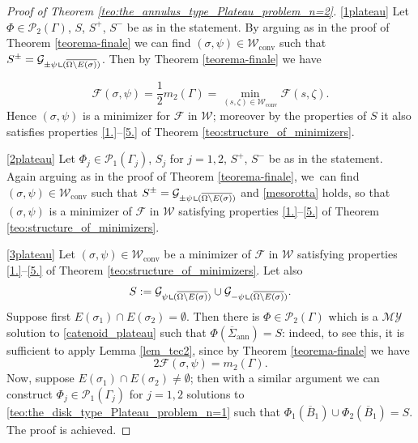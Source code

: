 \documentclass[JEP,XML,SOM,Unicode, NoFloatCountersInSection,published]{cedram}
\let\Om\Omega
\newcommand\admclassconv{{\mathcal W_\mathrm{conv}}}
\newcommand{\immclosedann}{\Phi({\overline\Sigma}_\mathrm{ann})}
\newcommand{\resa}{\mathop{\hbox{\vrule height 7pt width 0.5pt depth 0pt
\vrule height 0.5pt width 6pt depth 0pt}}\nolimits}
\newcommand{\resb}{\mathop{\hbox{\vrule height 4pt width 0.5pt depth 0pt
\vrule height 0.5pt width 3pt depth 0pt}}\nolimits}
\newcommand{\res}{\mathchoice{\resa}{\resa}{\resb}{\resb}}
\theoremstyle{definition}
\begin{document}
\skpt
\begin{proof}[Proof of Theorem \ref{teo:the_annulus_type_Plateau_problem_n=2}]

\ref{1plateau} Let $\Phi\in\mathcal{P}_2(\Gamma)$, $S$, $S^+$, $S^-$ be as in the statement.
By arguing as in the proof of Theorem \ref{teorema-finale} we can find $(\sigma,\psi)\in\admclassconv$ such that $S^\pm=\mathcal{G}_{\pm\psi\res (\overline{\Om\setminus E(\sigma)})}$.
Then by Theorem \ref{teorema-finale} we have

\begin{equation}\label{mesorotta}
\mathcal{F}(\sigma,\psi)=\frac12 m_2(\Gamma)= \min_{(s,\zeta)\in\admclassconv}\mathcal{F}(s,\zeta).
\end{equation}
Hence $(\sigma,\psi)$ is a minimizer for $\mathcal F$ in $\mathcal W$; moreover by the properties of $S$ it also satisfies properties \ref{1.}--\ref{5.} of Theorem \ref{teo:structure_of_minimizers}.

\ref{2plateau}
Let $\Phi_j\in \mathcal{P}_1(\Gamma_j)$, $S_j$ for $j=1,2$, $S^+$, $S^-$ be as in the statement.
Again arguing as in the proof of Theorem \ref{teorema-finale}, we~can find $(\sigma,\psi)\in\admclassconv$ such that $S^\pm=\mathcal{G}_{\pm\psi\res(\overline{\Om\setminus E(\sigma)})}$ and \eqref{mesorotta} holds, so that $(\sigma,\psi)$ is a minimizer of $\mathcal F$ in $\mathcal W$ satisfying properties \ref{1.}--\ref{5.} of Theorem \ref{teo:structure_of_minimizers}.

\ref{3plateau} Let $(\sigma,\psi)\in\admclassconv$ be a minimizer of $\mathcal F$ in $\mathcal W$ satisfying properties \ref{1.}--\ref{5.} of Theorem \ref{teo:structure_of_minimizers}. Let also
\[
S:=\mathcal G_{\psi\res (\overline{\Om\setminus E(\sigma)})}\cup\mathcal G_{-\psi\res (\overline{\Om\setminus E(\sigma)})}.
\]
Suppose first $E(\sigma_1)\cap E(\sigma_2)=\emptyset$. Then
there is $\Phi\in \mathcal{P}_2(\Gamma)$ which is a $\mathcal{MY}$ solution to \eqref{catenoid_plateau} such that $\immclosedann=S$:
indeed, to see this, it is sufficient to apply Lemma \ref{lem_tec2}, since by Theorem \ref{teorema-finale} we have
\begin{equation}\label{cd0}
2\mathcal F(\sigma, \psi)= m_2(\Gamma).
\end{equation}
Now, suppose
$E(\sigma_1)\cap E(\sigma_2)\ne\emptyset$; then with a similar argument we can construct $\Phi_j\in\mathcal P_1(\Gamma_j)$ for $j=1,2$ solutions to \eqref{teo:the_disk_type_Plateau_problem_n=1} such that $\Phi_1(\overline B_1)\cup \Phi_2(\overline B_1)=S$.
The proof is achieved.
\end{proof}
\end{document}

